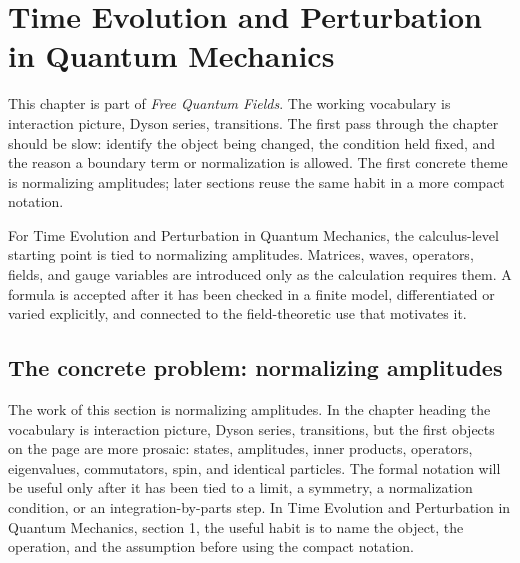 \chapter{Time Evolution and Perturbation in Quantum Mechanics}


This chapter is part of \emph{Free Quantum Fields}.  The working vocabulary is interaction picture, Dyson series, transitions.  The first pass through the chapter should be slow: identify the object being changed, the condition held fixed, and the reason a boundary term or normalization is allowed.  The first concrete theme is normalizing amplitudes; later sections reuse the same habit in a more compact notation.

For Time Evolution and Perturbation in Quantum Mechanics, the calculus-level starting point is tied to normalizing amplitudes.  Matrices, waves, operators, fields, and gauge variables are introduced only as the calculation requires them.  A formula is accepted after it has been checked in a finite model, differentiated or varied explicitly, and connected to the field-theoretic use that motivates it.

\section{The concrete problem: normalizing amplitudes}













The work of this section is normalizing amplitudes.  In the chapter heading the vocabulary is interaction picture, Dyson series, transitions, but the first objects on the page are more prosaic: states, amplitudes, inner products, operators, eigenvalues, commutators, spin, and identical particles.  The formal notation will be useful only after it has been tied to a limit, a symmetry, a normalization condition, or an integration-by-parts step.  In Time Evolution and Perturbation in Quantum Mechanics, section 1, the useful habit is to name the object, the operation, and the assumption before using the compact notation.

